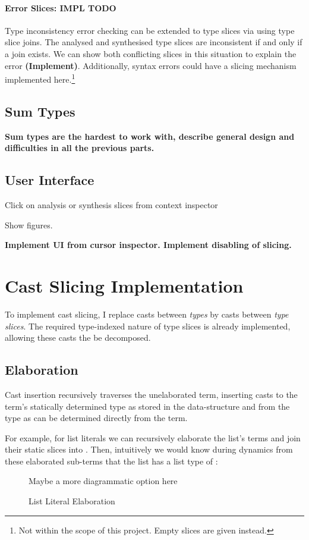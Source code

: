 \paragraph{Error Slices: IMPL TODO}
Type inconsistency error checking can be extended to type slices via using type slice joins. The analysed and synthesised type slices are inconsistent if and only if a join exists. We can show both conflicting slices in this situation to explain the error \textbf{(Implement)}. Additionally, syntax errors could have a slicing mechanism implemented here.\footnote{Not within the scope of this project. Empty slices are given instead.}

\subsection{Sum Types}
\textbf{Sum types are the hardest to work with, describe general design and difficulties in all the previous parts.}

\subsection{User Interface}
Click on analysis or synthesis slices from context inspector

Show figures.

\textbf{Implement UI from cursor inspector. Implement disabling of slicing.}

\section{Cast Slicing Implementation}\label{sec:CastSlicingImplementation}
To implement cast slicing, I replace casts between \textit{types} by casts between \textit{type slices}. The required type-indexed nature of type slices is already implemented, allowing these casts the be decomposed.

\subsection{Elaboration}\label{sec:Elaboration}
Cast insertion recursively traverses the unelaborated term, inserting casts to the term's statically determined type as stored in the  data-structure and from the type as can be determined directly from the term. 

For example, for list literals we can recursively elaborate the list's terms and join their static slices into . Then, intuitively we would know during dynamics from these elaborated sub-terms that the list has a list type of :
\begin{figure}[h]
Maybe a more diagrammatic option here
\caption{List Literal Elaboration}
\end{figure}

